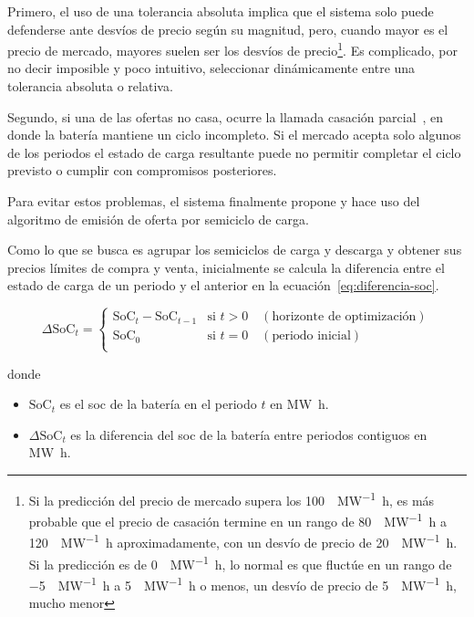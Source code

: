 Primero, el uso de una tolerancia absoluta implica que el sistema solo puede defenderse ante desvíos de precio según su magnitud, pero, cuando mayor es el precio de mercado, mayores suelen ser los desvíos de precio\footnote{Si la predicción del precio de mercado supera los \SI{100}{\text{\euro}\per\mega\watt\hour}, es más probable que el precio de casación termine en un rango de \SI{80}{\text{\euro}\per\mega\watt\hour} a \SI{120}{\text{\euro}\per\mega\watt\hour} aproximadamente, con un desvío de precio de \SI{20}{\text{\euro}\per\mega\watt\hour}. Si la predicción es de \SI{0}{\text{\euro}\per\mega\watt\hour}, lo normal es que fluctúe en un rango de \SI{-5}{\text{\euro}\per\mega\watt\hour} a \SI{5}{\text{\euro}\per\mega\watt\hour} o menos, un desvío de precio de \SI{5}{\text{\euro}\per\mega\watt\hour}, mucho menor}. Es complicado, por no decir imposible y poco intuitivo, seleccionar dinámicamente entre una tolerancia absoluta o relativa.

Segundo, si una de las ofertas no casa, ocurre la llamada casación parcial~\cite{cnmc2024mercados}, en donde la batería mantiene un ciclo incompleto. Si el mercado acepta solo algunos de los periodos el estado de carga resultante puede no permitir completar el ciclo previsto o cumplir con compromisos posteriores.

Para evitar estos problemas, el sistema finalmente propone y hace uso del algoritmo de emisión de oferta por semiciclo de carga.

Como lo que se busca es agrupar los semiciclos de carga y descarga y obtener sus precios límites de compra y venta, inicialmente se calcula la diferencia entre el estado de carga de un periodo y el anterior en la ecuación~\ref{eq:diferencia-soc}.

\begin{samepage}

  \begin{equation}
    \label{eq:diferencia-soc}
    \Delta \mathrm{SoC}_{t} =
    \begin{cases}
      \mathrm{SoC}_{t} - \mathrm{SoC}_{t-1} & \text{si } t > 0 \quad (\text{horizonte de optimización}) \\
      \mathrm{SoC}_{0}                      & \text{si } t = 0 \quad (\text{periodo inicial})           \\
    \end{cases}
  \end{equation}

  donde

  \begin{itemize}

    \item \( \mathrm{SoC}_{t} \) es el \gls{soc} de la batería en el periodo \( t \) en \si{{\mega\watt\hour}}.

    \item \( \Delta \mathrm{SoC}_{t} \) es la diferencia del \gls{soc} de la batería entre periodos contiguos en \si{{\mega\watt\hour}}.

  \end{itemize}

\end{samepage}

